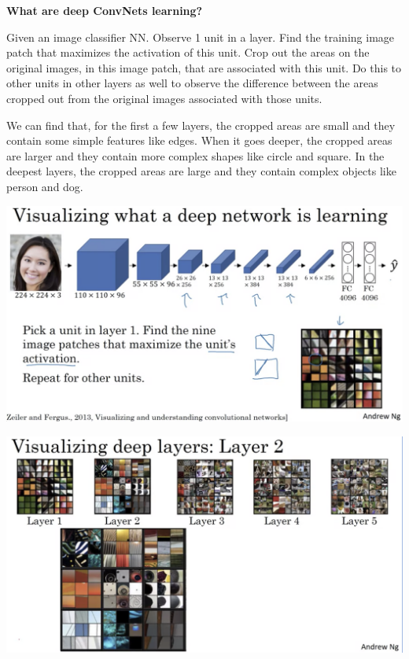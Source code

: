 \documentclass{article}
\begin{document}
\noindent \textbf{What are deep ConvNets learning?}

\noindent Given an image classifier NN. Observe 1 unit in a layer. Find the training image patch that maximizes the activation of this unit. Crop out the areas on the original images, in this image patch, that are associated with this unit. Do this to other units in other layers as well to observe the difference between the areas cropped out from the original images associated with those units.

\bigskip

\noindent We can find that, for the first a few layers, the cropped areas are small and they contain some simple features like edges. When it goes deeper, the cropped areas are larger and they contain more complex shapes like circle and square. In the deepest layers, the cropped areas are large and they contain complex objects like person and dog.

\begin{center}
\includegraphics[scale=0.4]{./images/deep_conv_learn.png}
\end{center}

\begin{center}
\includegraphics[scale=0.4]{./images/deep_conv_layer_learn.png}
\end{center}
\end{document}
